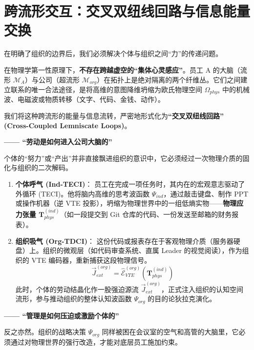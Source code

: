 \section{跨流形交互：交叉双纽线回路与信息能量交换}
\label{sec:cross_manifold_interaction}

在明确了组织的边界后，我们必须解决个体与组织之间“力”的传递问题。

在物理学第一性原理下，\textbf{不存在跨越虚空的“集体心灵感应”}。员工 A 的大脑（流形 $\mathcal{M}_A$）与公司（超流形 $\mathcal{M}_{org}$）在拓扑上是绝对隔离的两个纤维丛。它们之间建立联系的唯一合法途径，是将高维的意图降维坍缩为欧氏物理空间 $\Omega_{phys}$ 中的机械波、电磁波或物质转移（文字、代码、金钱、动作）。

我们将这种跨流形的能量与信息流转，严密地形式化为\textbf{“交叉双纽线回路” (Cross-Coupled Lemniscate Loops)}。


\textbf{—— “劳动是如何进入公司大脑的”}

个体的“努力”或“产出”并非直接飘进组织的意识中，它必须经过一次物理介质的固化与组织的二次解码。

\begin{enumerate}
    \item \textbf{个体呼气 (Ind-TECI)}：
    员工在完成一项任务时，其内在的宏观意志驱动了外循环 (TECI)。他将脑内高维的思考波函数 $\Psi_{ind}$，通过敲击键盘、制作 PPT 或操作机器（逆 VTE 投影），坍缩为物理世界中的一组低熵实物——\textbf{物理应力张量 $\mathbf{T}_{phys}^{(ind)}$}（如一段提交到 Git 仓库的代码、一份发送至邮箱的财务报表）。

    \item \textbf{组织吸气 (Org-TDCI)}：
    这份代码或报表存在于客观物理介质（服务器硬盘）上。组织的微观层（如代码审查系统、直属 Leader 的视觉阅读），作为组织的 VTE 编码器，重新捕获这段物理信号。
    $$ \vec{J}_{ext}^{(org)} = \hat{\mathcal{E}}_{VTE}^{(org)} \left( \mathbf{T}_{phys}^{(ind)} \right) $$
    此时，个体的劳动结晶化作一股强迫源流 $\vec{J}_{ext}^{(org)}$，正式注入组织的认知空间流形，参与推动组织的整体认知波函数 $\Psi_{org}$ 的目的论狄拉克演化。
\end{enumerate}


\textbf{—— “管理是如何压迫或激励个体的”}

反之亦然。组织的战略决策 $\Psi_{org}$ 同样被困在会议室的空气和高管的大脑里，它必须通过对物理世界的强行改造，才能对底层员工施加约束。

